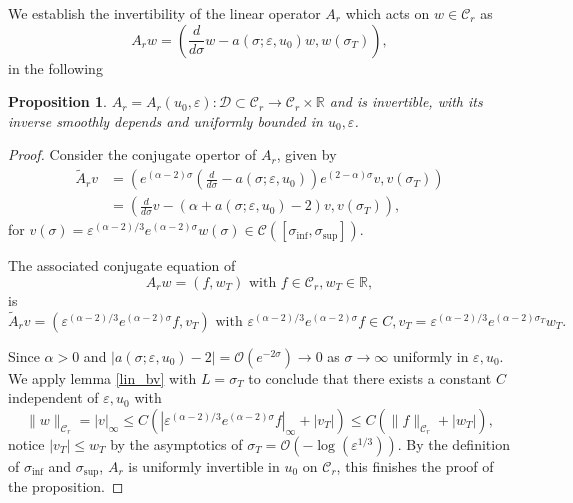 \documentclass[letterpaper,11pt]{article}
\newcommand{\rmO}{\mathcal{O}}
\newcommand{\eps}{\varepsilon}
\numberwithin{equation}{section}
\theoremstyle{plain}
\newtheorem{proposition}[theorem]{Proposition}
\begin{document}
We establish the invertibility of the linear operator $A_r$ which acts on $w \in \mathcal{C}_r$ as 
\[
A_r w = \left( \frac{d}{d\sigma}w-a(\sigma;\eps, u_0) w,  w(\sigma_T)\right),
\]
in the following
\begin{proposition}\label{inv_A_r}
$A_r=A_r(u_0,\eps) : \mathcal{D}\subset \mathcal{C}_r \to \mathcal{C}_r\times \mathbb{R}$ and is invertible, with its inverse smoothly depends and uniformly bounded in $u_0, \eps$. 
\end{proposition}
\begin{proof}
Consider the conjugate opertor of $A_r$, given by
\begin{align*}
\tilde{A}_r v &= \left( e^{(\alpha-2)\sigma}\left(\frac{d}{d\sigma}-a(\sigma;\eps,u_0)\right)e^{(2-\alpha)\sigma} v, v(\sigma_T) \right) \\
&= \left( \frac{d}{d\sigma}v -(\alpha+a(\sigma;\eps,u_0)-2)v, v(\sigma_T) \right),
\end{align*}
for $v(\sigma)=\eps^{(\alpha-2)/3}e^{(\alpha-2)\sigma}w(\sigma) \in \mathcal{C}([\sigma_{\inf}, \sigma_{\sup}])$. 

The associated conjugate equation of 
\[
A_r w = (f,w_T) \text{ with } f \in \mathcal{C}_r, w_T \in \mathbb{R},
\] is 
\[
\tilde{A}_r v = (\eps^{(\alpha-2)/3}e^{(\alpha-2)\sigma} f,v_T) \text{ with } \eps^{(\alpha-2)/3}e^{(\alpha-2)\sigma} f \in C , v_T = \eps^{(\alpha-2)/3} e^{(\alpha-2)\sigma_T}w_T.
\]
 
Since $\alpha > 0$ and $|a(\sigma;\eps,u_0) -2| = \rmO(e^{-2\sigma}) \to 0$ as $\sigma \to \infty$ uniformly in $\eps, u_0$. We apply lemma \ref{lin_bv} with $L= \sigma_T$ to conclude that there exists a constant $C$ independent of $\eps, u_0$ with 
\[
\|w\|_{\mathcal{C}_r} = |v|_\infty \le C(|\eps^{(\alpha-2)/3}e^{(\alpha-2)\sigma} f |_{\infty}+|v_T|) \le C(\|f\|_{\mathcal{C}_r}+|w_T|),
\]
notice $|v_T| \le w_T$ by the asymptotics of $\sigma_T  = \rmO(-\log(\eps^{1/3}))$. By the definition of $\sigma_{\inf}$ and $\sigma_{\sup}$, $A_r$ is uniformly invertible in $u_0$ on $\mathcal{C}_r$, this finishes the proof of the proposition.
\end{proof}
\end{document}
